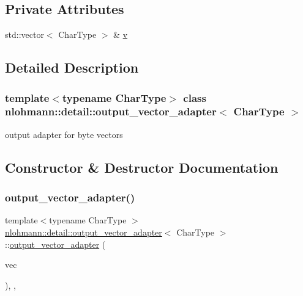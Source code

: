 \subsection*{Private Attributes}
\begin{DoxyCompactItemize}
\item 
std\+::vector$<$ Char\+Type $>$ \& \mbox{\hyperlink{classnlohmann_1_1detail_1_1output__vector__adapter_a9b1ed9fba14e671ae1abb6692560ef3f}{v}}
\end{DoxyCompactItemize}


\subsection{Detailed Description}
\subsubsection*{template$<$typename Char\+Type$>$\newline
class nlohmann\+::detail\+::output\+\_\+vector\+\_\+adapter$<$ Char\+Type $>$}

output adapter for byte vectors 

\subsection{Constructor \& Destructor Documentation}
\mbox{\label{classnlohmann_1_1detail_1_1output__vector__adapter_a9c4fbf88fda356837038ec30a264cd3e}} 
\subsubsection{\texorpdfstring{output\_vector\_adapter()}{output\_vector\_adapter()}}
{\footnotesize\ttfamily template$<$typename Char\+Type $>$ \\
\mbox{\hyperlink{classnlohmann_1_1detail_1_1output__vector__adapter}{nlohmann\+::detail\+::output\+\_\+vector\+\_\+adapter}}$<$ Char\+Type $>$\+::\mbox{\hyperlink{classnlohmann_1_1detail_1_1output__vector__adapter}{output\+\_\+vector\+\_\+adapter}} (\begin{DoxyParamCaption}\item[{std\+::vector$<$ Char\+Type $>$ \&}]{vec }\end{DoxyParamCaption})\hspace{0.3cm}{\ttfamily [inline]}, {\ttfamily [explicit]}, {\ttfamily [noexcept]}}



